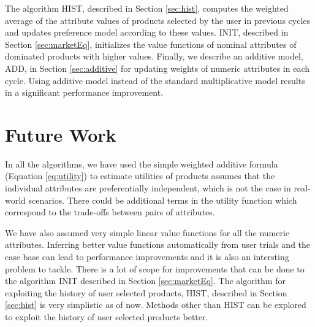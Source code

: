 The algorithm HIST, described in Section \ref{sec:hist}, computes the weighted average of the attribute values of products selected by the user in previous cycles and updates preference model according to these values.
INIT, described in Section \ref{sec:marketEq}, initializes the value functions of  nominal attributes of dominated products with higher values.
Finally, we describe an additive model, ADD, in Section \ref{sec:additive} for updating weights of numeric attributes in each cycle. 
Using additive model instead of the standard multiplicative model results in a significant performance improvement.


\section{Future Work}
In all the algorithms, we have used the simple weighted additive formula  (Equation \ref{eq:utility}) to estimate utilities of products assumes that the individual attributes are preferentially independent, which is not the case in real-world scenarios.
There could be additional terms in the utility function which correspond to the trade-offs between pairs of attributes.

We have also assumed very simple linear value functions for all the numeric attributes. 
Inferring better value functions automatically from user trials and the case base can lead to performance improvements and it is also an intersting problem to tackle.
There is a lot of scope for improvements that can be done to the algorithm INIT described in Section \ref{sec:marketEq}.
The algorithm for exploiting the history of user selected products, HIST, described in Section \ref{sec:hist} is very simplistic as of now. 
Methods other than HIST can be explored to exploit the history of user selected products better.
